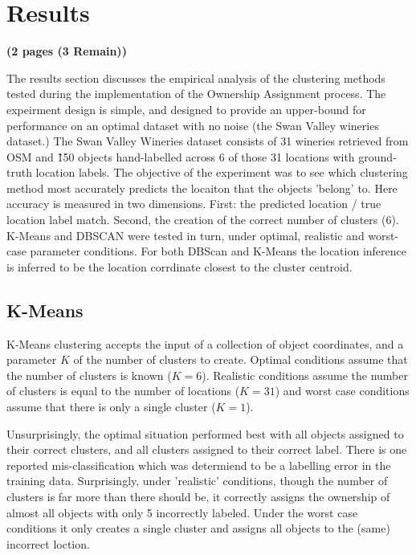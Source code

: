 \section{Results}
\label{section:results}
\textbf{(2 pages (3 Remain))}

The results section discusses the empirical analysis of the clustering methods tested during the implementation of the Ownership Assignment process. 
The expeirment design is simple, and designed to provide an upper-bound for performance on an optimal dataset with no noise (the Swan Valley wineries dataset.) 
The Swan Valley Wineries dataset consists of 31 wineries retrieved from OSM and \~150 objects hand-labelled across 6 of those 31 locations with ground-truth location labels. 
The objective of the experiment was to see which clustering method most accurately predicts the locaiton that the objects 'belong' to. Here accuracy is measured in two dimensions. 
First: the predicted location / true location label match. Second, the creation of the correct number of clusters (6).
K-Means and DBSCAN were tested in turn, under optimal, realistic and worst-case parameter conditions. For both DBScan and K-Means the location inference is inferred to be the location corrdinate closest to the cluster centroid. 

\subsection{K-Means}
K-Means clustering accepts the input of a collection of object coordinates, and a parameter $K$ of the number of clusters to create. 
Optimal conditions assume that the number of clusters is known ($K=6$). 
Realistic conditions assume the number of clusters is equal to the number of locations ($K=31$) and worst case conditions assume that there is only a single cluster ($K=1$). 


Unsurprisingly, the optimal situation performed best with all objects assigned to their correct clusters, and all clusters assigned to their correct label. There is one reported mis-classification which was determiend to be a labelling error in the training data. Surprisingly, under 'realistic' conditions, though the number of clusters is far more than there should be, it correctly assigns the ownership of almost all objects with only 5 incorrectly labeled. Under the worst case conditions it only creates a single cluster and assigns all objects to the (same) incorrect loction. 

